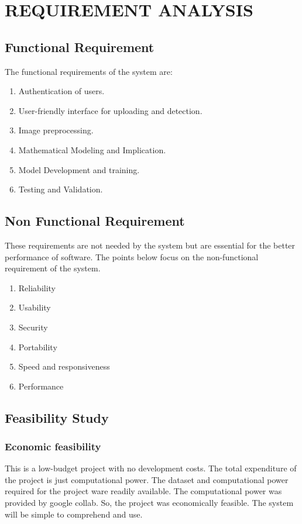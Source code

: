 
\section{REQUIREMENT ANALYSIS}

\subsection{Functional Requirement}
The functional requirements of the system are:
\begin{enumerate}
    \item Authentication of users.
    \item User-friendly interface for uploading and detection.
    \item Image preprocessing.
    \item Mathematical Modeling and Implication.
    \item Model Development and training.
    \item Testing and Validation.

\end{enumerate}

\subsection{Non Functional Requirement}
\justify
These requirements are not needed by the system but are essential for the better
performance of software. The points below focus on the non-functional requirement of
the system.
\begin{enumerate}
    \item Reliability
    \item   Usability
    \item   Security
    \item   Portability
    \item   Speed and responsiveness
    \item   Performance
\end{enumerate}

\subsection{Feasibility Study}

\subsubsection{Economic feasibility}
This is a low-budget project with no development costs. The total expenditure of the
project is just computational power. The dataset and computational power required for
the project ware readily available. The computational power was provided by google
collab. So, the project was economically feasible. The system will be simple to
comprehend and use.

